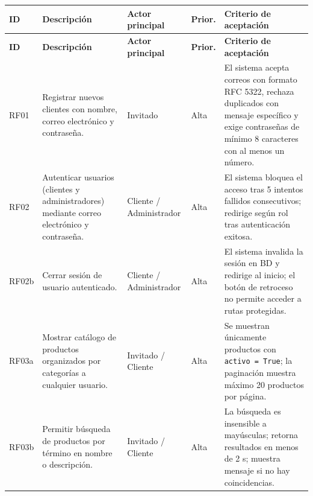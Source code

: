 \documentclass[12pt,a4paper]{article}
\begin{document}
\begin{longtable}{|l|p{5.5cm}|p{3cm}|p{1.5cm}|p{4cm}|}
    \hline
    \textbf{ID} & \textbf{Descripción}                                                                       & \textbf{Actor principal} & \textbf{Prior.} & \textbf{Criterio de aceptación} \\ \hline
    \endfirsthead
    \hline
    \textbf{ID} & \textbf{Descripción}                                                                       & \textbf{Actor principal} & \textbf{Prior.} & \textbf{Criterio de aceptación} \\ \hline
    \endhead

    RF01        & Registrar nuevos clientes con nombre, correo electrónico y contraseña.                     & Invitado                 & Alta            &
    El sistema acepta correos con formato RFC 5322, rechaza duplicados con mensaje específico y exige contraseñas de mínimo 8 caracteres con al menos un número.                            \\ \hline

    RF02        & Autenticar usuarios (clientes y administradores) mediante correo electrónico y contraseña. & Cliente / Administrador  & Alta            &
    El sistema bloquea el acceso tras 5 intentos fallidos consecutivos; redirige según rol tras autenticación exitosa.                                                                      \\ \hline

    RF02b       & Cerrar sesión de usuario autenticado.                                                      & Cliente / Administrador  & Alta            &
    El sistema invalida la sesión en BD y redirige al inicio; el botón de retroceso no permite acceder a rutas protegidas.                                                                  \\ \hline

    RF03a       & Mostrar catálogo de productos organizados por categorías a cualquier usuario.              & Invitado / Cliente       & Alta            &
    Se muestran únicamente productos con \texttt{activo = True}; la paginación muestra máximo 20 productos por página.                                                                      \\ \hline

    RF03b       & Permitir búsqueda de productos por término en nombre o descripción.                        & Invitado / Cliente       & Alta            &
    La búsqueda es insensible a mayúsculas; retorna resultados en menos de 2 s; muestra mensaje si no hay coincidencias.                                                                    \\ \hline


\end{longtable}
\end{document}
